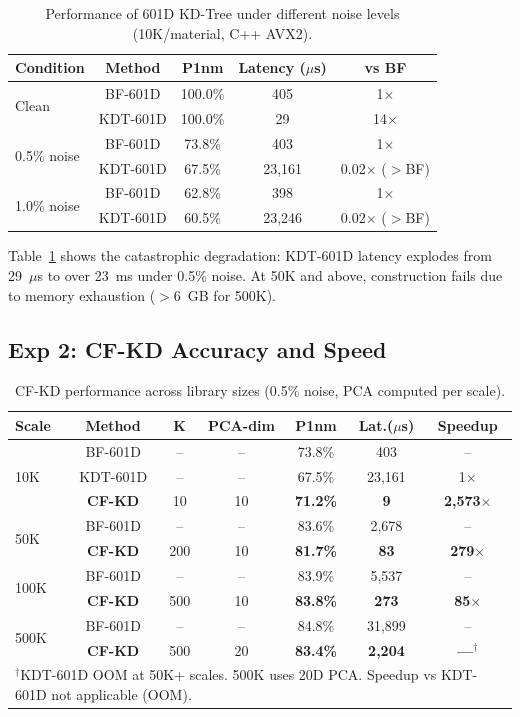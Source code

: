 \documentclass[final,5p,times]{elsarticle}
\begin{document}
\begin{table}[H]
\centering
\caption{Performance of 601D KD-Tree under different noise levels (10K/material, C++ AVX2).}
\label{tab:kdt_fail}
\begin{tabular}{lcccc}
\toprule
Condition & Method & P1nm & Latency ($\mu$s) & vs BF \\
\midrule
\multirow{2}{*}{Clean} & BF-601D & 100.0\% & 405 & 1$\times$ \\
 & KDT-601D & 100.0\% & 29 & 14$\times$ \\
\midrule
\multirow{2}{*}{0.5\% noise} & BF-601D & 73.8\% & 403 & 1$\times$ \\
 & KDT-601D & 67.5\% & 23,161 & 0.02$\times$ ($>$BF) \\
\midrule
\multirow{2}{*}{1.0\% noise} & BF-601D & 62.8\% & 398 & 1$\times$ \\
 & KDT-601D & 60.5\% & 23,246 & 0.02$\times$ ($>$BF) \\
\bottomrule
\end{tabular}
\end{table}

Table~\ref{tab:kdt_fail} shows the catastrophic degradation: KDT-601D latency explodes from 29~$\mu$s to over 23~ms under 0.5\% noise. At 50K and above, construction fails due to memory exhaustion ($>$6~GB for 500K).

\subsection{Exp 2: CF-KD Accuracy and Speed}

\begin{table}[H]
\centering
\caption{CF-KD performance across library sizes (0.5\% noise, PCA computed per scale).}
\label{tab:cfkd}
\begin{tabular}{lcccccc}
\toprule
Scale & Method & K & PCA-dim & P1nm & Lat.($\mu$s) & Speedup \\
\midrule
\multirow{3}{*}{10K} & BF-601D & -- & -- & 73.8\% & 403 & -- \\
 & KDT-601D & -- & -- & 67.5\% & 23,161 & 1$\times$ \\
 & \textbf{CF-KD} & 10 & 10 & \textbf{71.2\%} & \textbf{9} & \textbf{2,573$\times$} \\
\midrule
\multirow{2}{*}{50K} & BF-601D & -- & -- & 83.6\% & 2,678 & -- \\
 & \textbf{CF-KD} & 200 & 10 & \textbf{81.7\%} & \textbf{83} & \textbf{279$\times$} \\
\midrule
\multirow{2}{*}{100K} & BF-601D & -- & -- & 83.9\% & 5,537 & -- \\
 & \textbf{CF-KD} & 500 & 10 & \textbf{83.8\%} & \textbf{273} & \textbf{85$\times$} \\
\midrule
\multirow{2}{*}{500K} & BF-601D & -- & -- & 84.8\% & 31,899 & -- \\
 & \textbf{CF-KD} & 500 & 20 & \textbf{83.4\%} & \textbf{2,204} & \textbf{---$^\dagger$} \\
\bottomrule
\multicolumn{7}{l}{$^\dagger$KDT-601D OOM at 50K+ scales. 500K uses 20D PCA. Speedup vs KDT-601D not applicable (OOM).}\\
\end{tabular}
\end{table}
\end{document}
